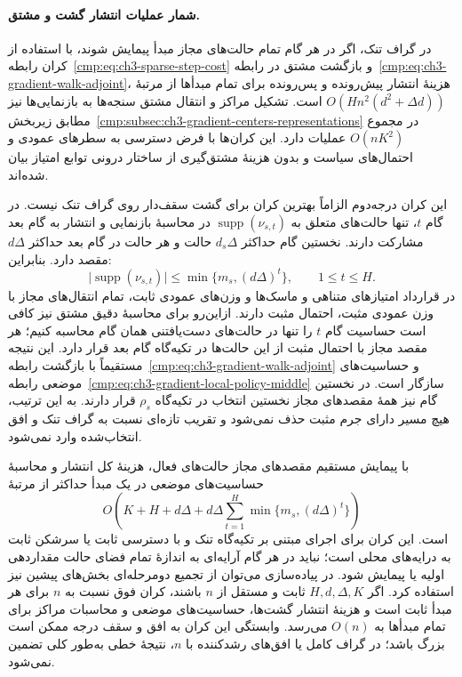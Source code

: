 \paragraph{شمار عملیات انتشار گشت و مشتق.}
در گراف تنک، اگر در هر گام تمام حالت‌های
مجاز مبدأ پیمایش شوند، با استفاده از کران
رابطه~\eqref{cmp:eq:ch3-sparse-step-cost}
و بازگشت مشتق در
رابطه~\eqref{cmp:eq:ch3-gradient-walk-adjoint}،
هزینهٔ انتشار پیش‌رونده و پس‌رونده برای
تمام مبدأها از مرتبهٔ
$O(Hn^2(d^2+\Delta d))$ است. تشکیل مراکز
و انتقال مشتق سنجه‌ها به بازنمایی‌ها نیز
مطابق زیربخش~\ref{cmp:subsec:ch3-gradient-centers-representations}
در مجموع $O(nK^2)$ عملیات دارد. این کران‌ها
با فرض دسترسی به سطرهای عمودی و احتمال‌های
سیاست و بدون هزینهٔ مشتق‌گیری از ساختار
درونی توابع امتیاز بیان شده‌اند.

این کران درجه‌دوم الزاماً بهترین کران
برای گشت سقف‌دار روی گراف تنک نیست.
در گام $t$، تنها حالت‌های متعلق به
$\operatorname{supp}(\nu_{s,t})$ در
محاسبهٔ بازنمایی و انتشار به گام بعد
مشارکت دارند. نخستین گام حداکثر
$d_s\Delta$ حالت و هر حالت در گام بعد
حداکثر $d\Delta$ مقصد دارد. بنابراین:
\begin{equation}\label{cmp:eq:ch3-gradient-reachable-bound}
\bigl|\operatorname{supp}(\nu_{s,t})\bigr|
\le\min\{m_s,(d\Delta)^t\},
\qquad 1\le t\le H.
\end{equation}
در قرارداد امتیازهای متناهی و ماسک‌ها و
وزن‌های عمودی ثابت، تمام انتقال‌های مجاز
با وزن عمودی مثبت، احتمال مثبت دارند.
ازاین‌رو برای محاسبهٔ دقیق مشتق نیز کافی است
حساسیت گام $t$ را تنها در حالت‌های
دست‌یافتنی همان گام محاسبه کنیم؛ هر مقصد
مجاز با احتمال مثبت از این حالت‌ها در
تکیه‌گاه گام بعد قرار دارد. این نتیجه
مستقیماً با بازگشت
رابطه~\eqref{cmp:eq:ch3-gradient-walk-adjoint}
و حساسیت‌های موضعی
رابطه~\eqref{cmp:eq:ch3-gradient-local-policy-middle}
سازگار است. در نخستین گام نیز همهٔ مقصدهای
مجاز نخستین انتخاب در تکیه‌گاه $\rho_s$
قرار دارند. به این ترتیب، هیچ مسیر دارای
جرم مثبت حذف نمی‌شود و تقریب تازه‌ای نسبت
به گراف تنک و افق انتخاب‌شده وارد نمی‌شود.

با پیمایش مستقیم مقصدهای مجاز حالت‌های
فعال، هزینهٔ کل انتشار و محاسبهٔ حساسیت‌های
موضعی در یک مبدأ حداکثر از مرتبهٔ
\[
O\left(K+H+d\Delta+
d\Delta\sum_{t=1}^{H}
\min\{m_s,(d\Delta)^t\}\right)
\]
است. این کران برای اجرای مبتنی بر تکیه‌گاه
تنک و با دسترسی ثابت یا سرشکن ثابت به
درایه‌های محلی است؛ نباید در هر گام آرایه‌ای
به اندازهٔ تمام فضای حالت مقداردهی اولیه
یا پیمایش شود. در پیاده‌سازی می‌توان از
تجمیع دومرحله‌ای بخش‌های پیشین نیز استفاده
کرد. اگر $H,d,\Delta,K$ ثابت و مستقل از $n$
باشند، کران فوق نسبت به $n$ برای هر مبدأ
ثابت است و هزینهٔ انتشار گشت‌ها، حساسیت‌های
موضعی و محاسبات مراکز برای تمام مبدأها به
$O(n)$ می‌رسد. وابستگی این کران به افق
و سقف درجه ممکن است بزرگ باشد؛ در گراف
کامل یا افق‌های رشدکننده با $n$، نتیجهٔ خطی
به‌طور کلی تضمین نمی‌شود.

